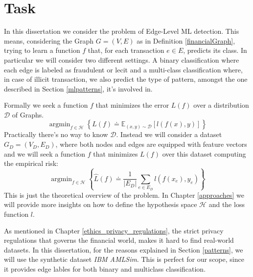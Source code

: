 \chapter{Task}
In this dissertation we consider the problem of Edge-Level ML detection. This means, considering the Graph $G = (V, E)$ as in Definition \ref{financialGraph}, trying to learn a function \(f\) that, for each transaction $e \in E$, predicts its class. In particular we will consider two different settings. A binary classification where each edge is labeled as fraudulent or lecit and a multi-class classification where, in case of illicit transaction, we also predict the type of pattern, amongst the one described in Section \ref{mlpatterns}, it's involved in.

Formally we seek a function \(f\) that minimizes the error \(L(f)\) over a distribution \(\mathcal{D}\) of Graphs.
\begin{equation}
    \operatorname{argmin}_{f \in \mathcal{H}} \left\{L(f) \doteq \mathbb{E}_{(x,y) \sim \mathcal{D}} [l(f(x), y)]\right\}
\end{equation}
Practically there's no way to know \(\mathcal{D}\). Instead we will consider a dataset \(G_D = (V_D, E_D)\), where both nodes and edges are equipped with feature vectors and we will seek a function \(f\) that minimizes \(L(f)\) over this dataset computing the empirical risk:
\begin{equation}
    \operatorname{argmin}_{f \in \mathcal{H}} \left\{\hat{L}(f) \doteq \frac{1}{|E_D|} \sum_{e \in E_D} l(f(x_e), y_e)\right\}
\end{equation}
This is just the theoretical overview of the problem. In Chapter \ref{approaches} we will provide more insights on how to define the hypothesis space \(\mathcal{H}\) and the loss function \(l\). 

As mentioned in Chapter \ref{ethics_privacy_regulations}, the strict privacy regulations that governs the financial world, makes it hard to find real-world datasets. In this dissertation, for the reasons explained in Section \ref{patterns}, we will use the synthetic dataset \textit{IBM AMLSim}. This is perfect for our scope, since it provides edge lables for both binary and multiclass classification.

